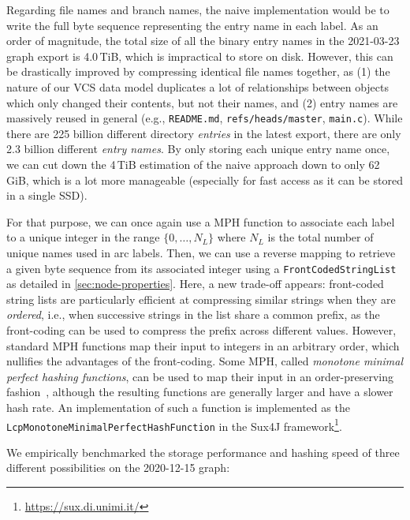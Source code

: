 Regarding file names and branch names, the naive implementation would be to
write the full byte sequence representing the entry name in each label. As an
order of magnitude, the total size of all the binary entry names in the
2021-03-23 graph export is 4.0\,TiB, which is impractical to store on disk.
However, this can be drastically improved by compressing identical file names
together, as (1) the nature of our \gls{VCS} data model duplicates a lot of
relationships between objects which only changed their contents, but not their
names, and (2) entry names are massively reused in general (e.g.,
\texttt{README.md}, \texttt{refs/heads/master}, \texttt{main.c}).
While there are 225 billion different directory \emph{entries} in the
latest export, there are only 2.3 billion different \emph{entry names}.
By only storing each unique entry name once, we can cut down the 4\,TiB
estimation of the naive approach down to only 62\,GiB, which is a lot more
manageable (especially for fast access as it can be stored in a single SSD).

For that purpose, we can once again use a \gls{MPH} function to associate each
label to a unique integer in the range $\{0, \ldots, N_L\}$ where $N_L$ is the
total number of unique names used in arc labels. Then, we can use a reverse
mapping to retrieve a given byte sequence from its associated integer using a
\texttt{FrontCodedStringList} as detailed in \cref{sec:node-properties}.  Here,
a new trade-off appears: front-coded string lists are particularly efficient at
compressing similar strings when they are \emph{ordered}, i.e., when successive
strings in the list share a common prefix, as the front-coding can be used to
compress the prefix across different values. However, standard \gls{MPH}
functions map their input to integers in an arbitrary order, which nullifies
the advantages of the front-coding. Some \gls{MPH}, called \emph{monotone
minimal perfect hashing functions}, can be used to map their input in an
order-preserving fashion~\cite{belazzougui2008theory}, although the resulting
functions are generally larger and have a slower hash rate. An implementation
of such a function is implemented as the
\texttt{LcpMonotoneMinimalPerfectHashFunction} in the Sux4J
framework\footnote{\url{https://sux.di.unimi.it/}}.

We empirically benchmarked the storage performance and hashing speed of three
different possibilities on the 2020-12-15 graph:

